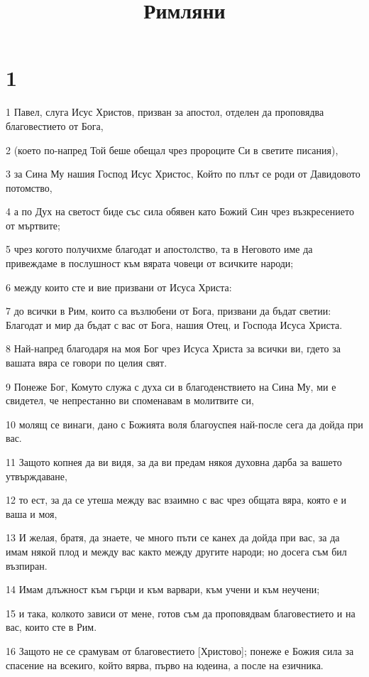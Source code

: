 

\title{Римляни}


\chapter{1}

\par 1 Павел, слуга Исус Христов, призван за апостол, отделен да проповядва благовестието от Бога,
\par 2 (което по-напред Той беше обещал чрез пророците Си в светите писания),
\par 3 за Сина Му нашия Господ Исус Христос, Който по плът се роди от Давидовото потомство,
\par 4 а по Дух на светост биде със сила обявен като Божий Син чрез възкресението от мъртвите;
\par 5 чрез когото получихме благодат и апостолство, та в Неговото име да привеждаме в послушност към вярата човеци от всичките народи;
\par 6 между които сте и вие призвани от Исуса Христа:
\par 7 до всички в Рим, които са възлюбени от Бога, призвани да бъдат светии: Благодат и мир да бъдат с вас от Бога, нашия Отец, и Господа Исуса Христа.
\par 8 Най-напред благодаря на моя Бог чрез Исуса Христа за всички ви, гдето за вашата вяра се говори по целия свят.
\par 9 Понеже Бог, Комуто служа с духа си в благоденствието на Сина Му, ми е свидетел, че непрестанно ви споменавам в молитвите си,
\par 10 молящ се винаги, дано с Божията воля благоуспея най-после сега да дойда при вас.
\par 11 Защото копнея да ви видя, за да ви предам някоя духовна дарба за вашето утвърждаване,
\par 12 то ест, за да се утеша между вас взаимно с вас чрез общата вяра, която е и ваша и моя,
\par 13 И желая, братя, да знаете, че много пъти се канех да дойда при вас, за да имам някой плод и между вас както между другите народи; но досега съм бил възпиран.
\par 14 Имам длъжност към гърци и към варвари, към учени и към неучени;
\par 15 и така, колкото зависи от мене, готов съм да проповядвам благовестието и на вас, които сте в Рим.
\par 16 Защото не се срамувам от благовестието [Христово]; понеже е Божия сила за спасение на всекиго, който вярва, първо на юдеина, а после на езичника.
